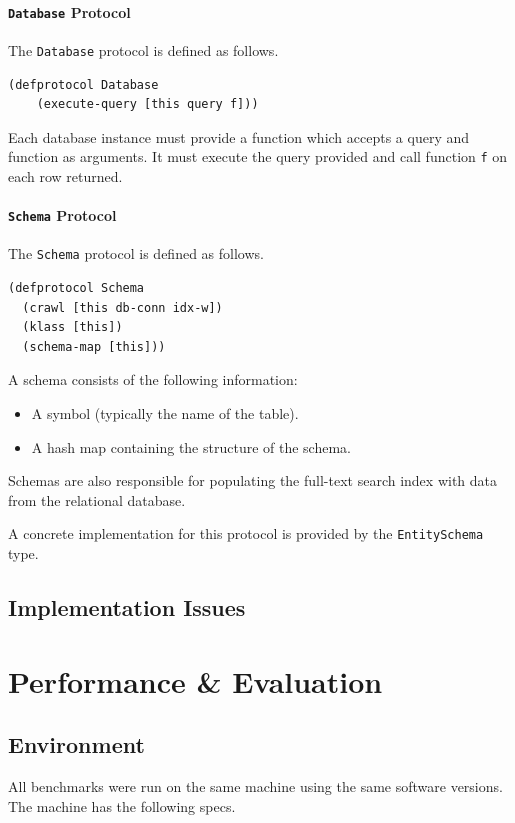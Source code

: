 \documentclass[12pt,letterpaper,oneside]{report}
\theoremstyle{definition}
\begin{document}
				\subsubsection{\texttt{Database} Protocol}
					The \texttt{Database} protocol is defined as follows.
					
					\begin{verbatim}
(defprotocol Database
	(execute-query [this query f]))
					\end{verbatim}
					
					Each database instance must provide a function which accepts a query and function as arguments.  It must execute the query provided and call function \texttt{f} on each row returned.
				
				\subsubsection{\texttt{Schema} Protocol}
					The \texttt{Schema} protocol is defined as follows.
					
					\begin{verbatim}
(defprotocol Schema
  (crawl [this db-conn idx-w])
  (klass [this])
  (schema-map [this]))
  				\end{verbatim}
					
					A schema consists of the following information:
					
					\begin{itemize}
						\item A symbol (typically the name of the table).
						\item A hash map containing the structure of the schema.
					\end{itemize}
					
					Schemas are also responsible for populating the full-text search index with data from the relational database.
					
					A concrete implementation for this protocol is provided by the \texttt{EntitySchema} type.
		
		\section{Implementation Issues}
	
	\chapter{Performance \& Evaluation}
		\section{Environment}
			All benchmarks were run on the same machine using the same software versions.  The machine has the following specs.
			
\end{document}
